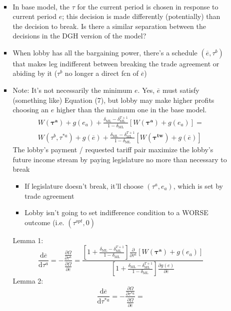 \documentclass[12pt]{article}
\newcommand{\ov}{\overline}
\newcommand{\bta}{\bm{\tau^a}}
\newcommand{\btw}{\bm{\tau^{tw}}}
\newcommand{\de}{\delta}
\begin{document}
\begin{itemize}
\begin{itemize}
\begin{itemize}
\begin{multline}
  \label{ine:leg2}
					\end{multline}
						\item In base model, the $\tau$ for the current period is chosen in response to current period $e$; this decision is made differently (potentially) than the decision to break. Is there a similar separation between the decisions in the DGH version of the model?
						\item When lobby has all the bargaining power, there's a schedule $(\ov{e},\tau^b)$ that makes leg indifferent between breaking the trade agreement or abiding by it ($\tau^b$ no longer a direct fcn of $\ov{e}$)
						\item Note: It's not necessarily the minimum $e$. Yes, $\ov{e}$ must satisfy (something like) Equation (7), but lobby may make higher profits choosing an $e$ higher than the minimum one in the base model.
							\begin{multline}
								W(\bta) + g(e_a) + \frac{\de_\text{ML} - \de_\text{ML}^{T+1}}{1-\de_\text{ML}}\left[W(\bta) + g(e_a)\right] = \\
	W(\tau^b,\tau^{*a}) +g(\ov{e}) + \frac{\de_\text{ML} - \de_\text{ML}^{T+1}}{1-\de_\text{ML}} \left[W(\btw) + g(\ov{e})\right]
								\label{eq:newleg}
							\end{multline}
							The lobby's payment / requested tariff pair maximize the lobby's future income stream by paying legislature no more than necessary to break
								\begin{itemize}
									\item If legislature doesn't break, it'll choose $\left(\tau^a,e_a\right)$, which is set by trade agreement
									\item Lobby isn't going to set indifference condition to a WORSE outcome (i.e. $\left(\tau^{opt},0\right)$
								\end{itemize}
							Lemma 1:
							\begin{equation}
								\frac{\mathrm{d} \ov{e}}{\mathrm{d} \tau^a} = -\frac{\frac{\partial \Omega}{\partial \tau^a}}{\frac{\partial \Omega}{\partial \ov{e}}} =
	\textstyle \frac{\left[1+ \frac{\de_\text{ML} - \de_\text{ML}^{T+1}}{1-\de_\text{ML}}  \right]\frac{\partial}{\partial \tau^a}\left[W(\bta) + g(e_a)\right]}{\left[1+\frac{\de_\text{ML} - \de_\text{ML}^{T+1}}{1-\de_\text{ML}}\right] \frac{\partial g(e)}{\partial \ov{e}} }
							\end{equation}
							Lemma 2:
							\begin{equation*}
								\frac{\mathrm{d} \ov{e}}{\mathrm{d} \tau^{*a}} = -\frac{\frac{\partial \Omega}{\partial \tau^{*a}}}{\frac{\partial \Omega}{\partial \ov{e}}} =

\end{equation*}
\end{itemize}
\end{itemize}
\end{itemize}
\end{document}
